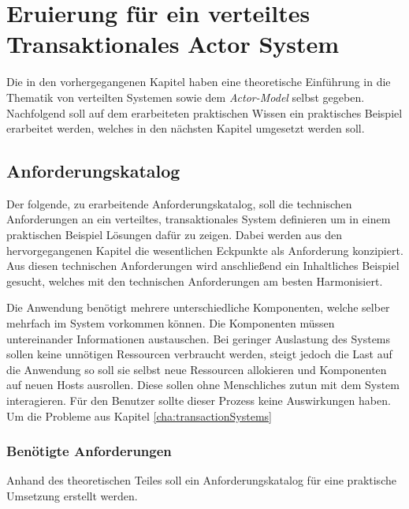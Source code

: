 \chapter{Eruierung für ein verteiltes Transaktionales Actor System} \label{cha:Eruierung}
Die in den vorhergegangenen Kapitel haben eine theoretische Einführung in die Thematik von verteilten Systemen sowie dem \textit{Actor-Model} selbst gegeben. Nachfolgend soll auf dem erarbeiteten praktischen Wissen ein praktisches Beispiel erarbeitet werden, welches in den nächsten Kapitel umgesetzt werden soll.  

\section{Anforderungskatalog}
Der folgende, zu erarbeitende Anforderungskatalog, soll die technischen Anforderungen an ein verteiltes, transaktionales System definieren um in einem praktischen Beispiel Lösungen dafür zu zeigen. Dabei werden aus den hervorgegangenen Kapitel die  wesentlichen Eckpunkte als Anforderung konzipiert. Aus diesen technischen Anforderungen wird anschließend ein Inhaltliches Beispiel gesucht, welches mit den technischen Anforderungen am besten Harmonisiert.

\begin{enumerate}
Die Anwendung benötigt mehrere unterschiedliche Komponenten, welche selber mehrfach im System vorkommen können. Die Komponenten müssen untereinander Informationen austauschen.
Bei geringer Auslastung des Systems sollen keine unnötigen Ressourcen verbraucht werden, steigt jedoch die Last auf die Anwendung so soll sie selbst neue Ressourcen allokieren und Komponenten auf neuen Hosts ausrollen. Diese sollen ohne Menschliches zutun mit dem System interagieren. Für den Benutzer sollte dieser Prozess keine Auswirkungen haben.
Um die Probleme aus Kapitel \ref{cha:transactionSystems}

\end{enumerate}






\subsection{Benötigte Anforderungen}
Anhand des theoretischen Teiles soll ein Anforderungskatalog für eine praktische Umsetzung erstellt werden.

